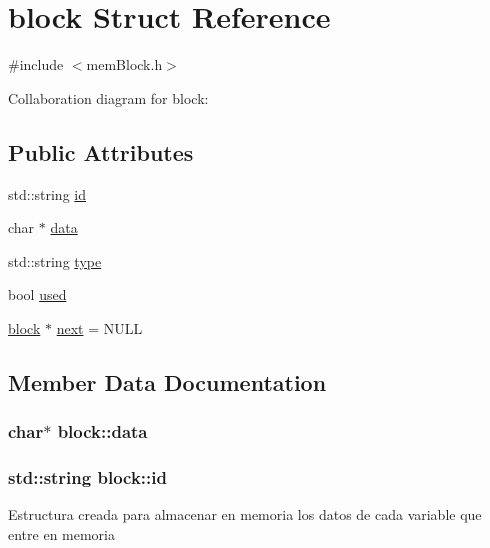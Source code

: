 \hypertarget{structblock}{}\section{block Struct Reference}
\label{structblock}


{\ttfamily \#include $<$mem\+Block.\+h$>$}



Collaboration diagram for block\+:
\subsection*{Public Attributes}
\begin{DoxyCompactItemize}
\item 
std\+::string \hyperlink{structblock_a6a9c4ef6042f2dd6bc70681175d55470}{id}
\item 
char $\ast$ \hyperlink{structblock_aea1e121326c80e00ecd3b984fe66e52f}{data}
\item 
std\+::string \hyperlink{structblock_a37c3af86f231299df298c75962bfa586}{type}
\item 
bool \hyperlink{structblock_ac91d285d48c574a14b428b2a07dfbf48}{used}
\item 
\hyperlink{structblock}{block} $\ast$ \hyperlink{structblock_aa60741c348a6f565b2c1e94df9451d59}{next} = N\+U\+LL
\end{DoxyCompactItemize}


\subsection{Member Data Documentation}
\subsubsection[{\texorpdfstring{data}{data}}]{\setlength{\rightskip}{0pt plus 5cm}char$\ast$ block\+::data}\hypertarget{structblock_aea1e121326c80e00ecd3b984fe66e52f}{}\label{structblock_aea1e121326c80e00ecd3b984fe66e52f}
\subsubsection[{\texorpdfstring{id}{id}}]{\setlength{\rightskip}{0pt plus 5cm}std\+::string block\+::id}\hypertarget{structblock_a6a9c4ef6042f2dd6bc70681175d55470}{}\label{structblock_a6a9c4ef6042f2dd6bc70681175d55470}
Estructura creada para almacenar en memoria los datos de cada variable que entre en memoria 
